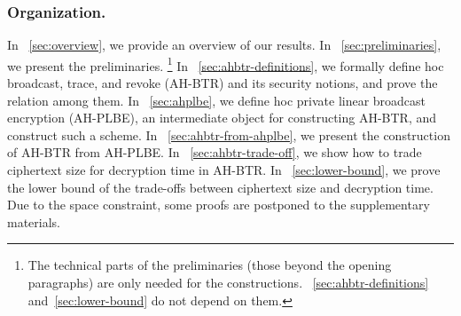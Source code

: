 \subsubsection{Organization.}
In \Section~\ref{sec:overview}, we provide an overview of our results.
In \Section~\ref{sec:preliminaries}, we present the preliminaries.%
\footnote{The technical parts of the preliminaries (those beyond the opening paragraphs) are only needed for the constructions.
\Sections~\ref{sec:ahbtr-definitions} and~\ref{sec:lower-bound} do not depend on them.}
In \Section~\ref{sec:ahbtr-definitions}, we formally define \ad hoc broadcast, trace, and revoke (AH-BTR) and its security notions, and prove the relation among them.
In \Section~\ref{sec:ahplbe}, we define \ad hoc private linear broadcast encryption (AH-PLBE), an intermediate object for constructing AH-BTR, and construct such a scheme.
In \Section~\ref{sec:ahbtr-from-ahplbe}, we present the construction of AH-BTR from AH-PLBE.
In \Section~\ref{sec:ahbtr-trade-off}, we show how to trade ciphertext size for decryption time in AH-BTR.
In \Section~\ref{sec:lower-bound}, we prove the lower bound of the trade-offs between ciphertext size and decryption time.
Due to the space constraint, some proofs are postponed to the supplementary materials.
